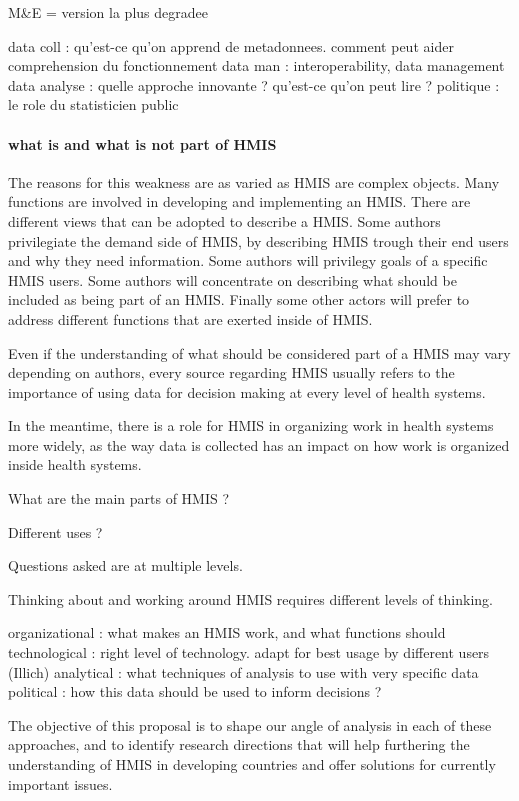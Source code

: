 \documentclass[a4paper,11pt,final,twoside]{article}
\begin{document}
M\&E = version la plus degradee

data coll : qu'est-ce qu'on apprend de metadonnees. comment peut aider comprehension du fonctionnement
data man : interoperability, data management
data analyse : quelle approche innovante ? qu'est-ce qu'on peut lire ?
politique : le role du statisticien public


\paragraph{what is and what is not part of HMIS} The reasons for this weakness are as varied as HMIS are complex objects. Many functions are involved in developing and implementing an HMIS. There are different views that can be adopted to describe a HMIS. Some authors privilegiate the demand side of HMIS, by describing HMIS trough their end users and why they need information. Some authors will privilegy goals of a specific HMIS users. Some authors will concentrate on describing what should be included as being part of an HMIS. Finally some other actors will prefer to address different functions that are exerted inside of HMIS. 

Even if the understanding of what should be considered part of a HMIS may vary depending on authors, every source regarding HMIS usually refers to the importance of using data for decision making at every level of health systems. 

In the meantime, there is a role for HMIS in organizing work in health systems more widely, as the way data is collected has an impact on how work is organized inside health systems. 

What are the main parts of HMIS ?

Different uses ?

Questions asked are at multiple levels.

Thinking about and working around HMIS requires different levels of thinking. 

organizational : what makes an HMIS work, and what functions should 
technological : right level of technology. adapt for best usage by different users (Illich)
analytical : what techniques of analysis to use with very specific data 
political : how this data should be used to inform decisions ?

The objective of this proposal is to shape our angle of analysis in each of these approaches, and to identify research directions that will help furthering the understanding of HMIS in developing countries and offer solutions for currently important issues.
\end{document}
